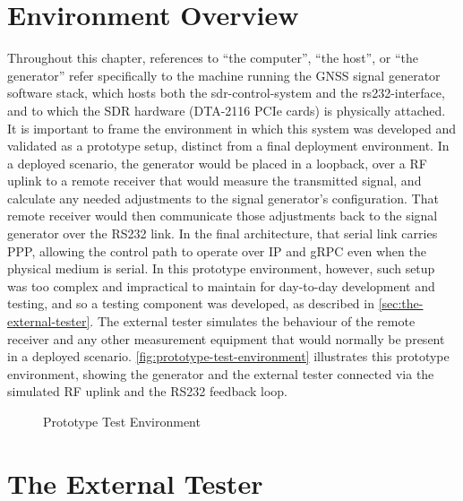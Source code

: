\section{Environment Overview}
Throughout this chapter, references to ``the computer'', ``the host'', or ``the
generator'' refer specifically to the machine running the \gls{GNSS} signal
generator software stack, which hosts both the \gls{sdr-control-system} and the
\gls{rs232-interface}, and to which the \gls{SDR} hardware (DTA-2116 PCIe
cards) is physically attached.
It is important to frame the environment in which this system was developed and
validated as a prototype setup, distinct from a final deployment environment.
In a deployed scenario, the generator would be placed in a loopback, over a
\gls{RF} uplink to a remote receiver that would measure the transmitted signal,
and calculate any needed adjustments to the signal generator's configuration.
That remote receiver would then communicate those adjustments back to the
signal generator over the \gls{RS232} link. In the final architecture, that
serial link carries \gls{PPP}, allowing the control path to operate over IP and
gRPC even when the physical medium is serial. In this prototype environment,
however, such setup was too complex and impractical to maintain for day-to-day
development and testing, and so a testing component was developed, as described in
\autoref{sec:the-external-tester}. The external tester simulates the behaviour
of the remote receiver and any other measurement equipment that would normally
be present in a deployed scenario.
\autoref{fig:prototype-test-environment} illustrates this prototype
environment, showing the generator and the external tester connected via
the simulated \gls{RF} uplink and the \gls{RS232} feedback loop.

\begin{figure}[htbp]
      \centering
      
      \caption{Prototype Test Environment}
      \label{fig:prototype-test-environment}
\end{figure}


\section{The External Tester}
\label{sec:the-external-tester}

